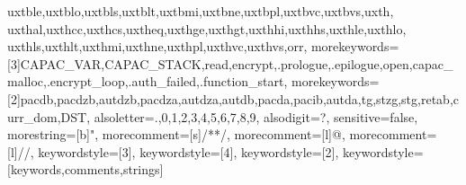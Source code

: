 {{      uxtble,uxtblo,uxtbls,uxtblt,uxtbmi,uxtbne,uxtbpl,uxtbvc,uxtbvs,uxth,    %
      uxthal,uxthcc,uxthcs,uxtheq,uxthge,uxthgt,uxthhi,uxthhs,uxthle,uxthlo,  %
      uxthls,uxthlt,uxthmi,uxthne,uxthpl,uxthvc,uxthvs,orr},%
    morekeywords=[3]{CAPAC_VAR,CAPAC_STACK,read,encrypt,.prologue,.epilogue,open,capac\_malloc,.encrypt_loop,.auth_failed,.function_start},%
    morekeywords=[2]{pacdb,pacdzb,autdzb,pacdza,autdza,autdb,pacda,pacib,autda,tg,stzg,stg,retab,curr_dom,DST},
    alsoletter={.,0,1,2,3,4,5,6,7,8,9},%
    alsodigit={?},%
    sensitive=false,%
    morestring=[b]",%
    morecomment=[s]{/*}{*/},%
    morecomment=[l]@,%
    morecomment=[l]//,%
    keywordstyle={[3]\color{clr-keyword}},%
    keywordstyle={[4]\color{magenta}},%
    keywordstyle={[2]\bfseries},%
    keywordstyle={\color{black}}%
   }[keywords,comments,strings]
